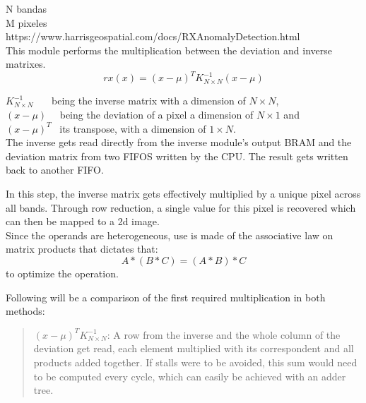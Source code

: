 N bandas\\
M pixeles\\
https://www.harrisgeospatial.com/docs/RXAnomalyDetection.html\\

\noindent This module performs the multiplication between the deviation and inverse matrixes.
\[ rx(x) = (x-\mu)^{T} K^{-1}_{N \times N} (x-\mu) \]


\indent \(K^{-1}_{N \times N}\) \ \ \ being the inverse matrix with a dimension of \(N \times N\),\\
\indent \((x-\mu)\) \ \	being the deviation of a pixel a dimension of \(N \times 1\) and \\			
\indent \((x-\mu)^{T}\) \ its transpose, with a dimension of \(1 \times N\).\\

The inverse gets read directly from the inverse module's output BRAM and the deviation matrix from two  FIFOS written by the CPU. The result gets written back to another FIFO.

In this step, the inverse matrix gets effectively multiplied by a unique pixel across all bands. Through row reduction, a single value for this pixel is recovered which can then be mapped to a 2d image.\\

Since the operands are heterogeneous, use is made of the associative law on matrix products that dictates that:
	\[A * (B * C) = (A * B) * C\]
	to optimize the operation.\\


\newcommand\rb{\colorbox{red!20}}
\newcommand\bb{\colorbox{blue!20}}
\newcommand\gb{\colorbox{green!20}}
\newcommand\rr{\rowcolor{red!20}}
\newcommand\br{\rowcolor{blue!20}}
\newcommand\gr{\rowcolor{green!20}}

\noindent Following will be a comparison of the first required multiplication in both methods:
\begin{quote}
	\((x-\mu)^{T} K^{-1}_{N \times N}\):	
	A row from the inverse and the whole column of the deviation get read, each element multiplied with its correspondent and all products added together. If stalls were to be avoided, this sum would need to be computed every cycle, which can easily be achieved with an adder tree.
\end{quote}

